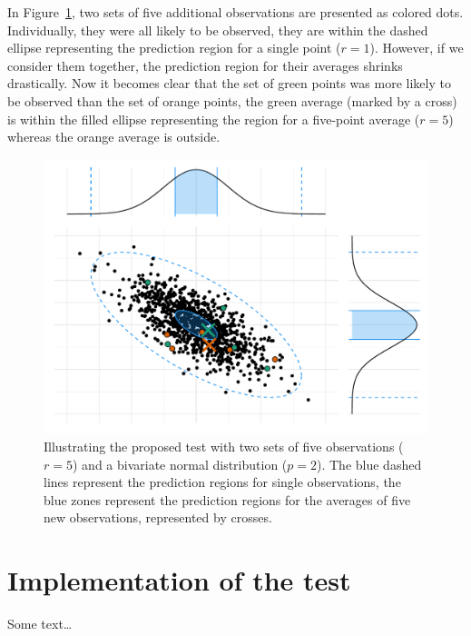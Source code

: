             In Figure~\ref{fig:non_regression:stat:several_points}, two sets of five additional observations are presented
            as colored dots. Individually, they were all likely to be observed, they are within the dashed ellipse
            representing the  prediction region for a single point (\ie \(r=1\)). However, if we
            consider them together, the prediction region for their averages shrinks drastically. Now it becomes clear that
            the set of green points was more likely to be observed than the set of orange points, the green average (marked
            by a cross) is within the filled ellipse representing the  region for a five-point average
            (\ie \(r=5\)) whereas the orange average is outside.

            \begin{figure}[htpb]
                \centering
                \includegraphics[width=0.9\linewidth]{img/experiment/non_regression/statistics/several_points.pdf}
                \caption{Illustrating the proposed test with two sets of five observations (\(r=5\)) and a bivariate normal
                distribution (\(p=2\)). The blue dashed lines represent the  prediction regions for
                single observations, the blue zones represent the  prediction regions for the averages of
                five new observations, represented by crosses.}%
                \label{fig:non_regression:stat:several_points}
            \end{figure}

    \section{Implementation of the test}%
    \label{sec:test_implementation}
        Some text\dots


